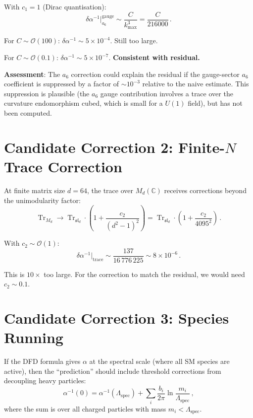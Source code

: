 \documentclass[11pt,a4paper]{article}
\newcommand{\Tr}{\operatorname{Tr}}
\begin{document}
With $c_1 = 1$ (Dirac quantisation):
\begin{equation}
\delta\alpha^{-1}\big|_{a_6}^{\mathrm{gauge}} \sim \frac{C}{k_{\max}^3} = \frac{C}{216000}\,.
\end{equation}

For $C \sim \mathcal{O}(100)$: $\delta\alpha^{-1} \sim 5 \times 10^{-4}$. Still too large.

For $C \sim \mathcal{O}(0.1)$: $\delta\alpha^{-1} \sim 5 \times 10^{-7}$. \textbf{Consistent with residual.}

\textbf{Assessment}: The $a_6$ correction could explain the residual if the gauge-sector $a_6$ coefficient is suppressed by a factor of $\sim 10^{-3}$ relative to the naive estimate. This suppression is plausible (the $a_6$ gauge contribution involves a trace over the curvature endomorphism cubed, which is small for a $U(1)$ field), but has not been computed.

\section{Candidate Correction 2: Finite-$N$ Trace Correction}

At finite matrix size $d = 64$, the trace over $M_d(\mathbb{C})$ receives corrections beyond the unimodularity factor:
\begin{equation}
\Tr_{M_d} \to \Tr_{\mathfrak{sl}_d} \cdot \left(1 + \frac{c_2}{(d^2-1)^2}\right) = \Tr_{\mathfrak{sl}_d} \cdot \left(1 + \frac{c_2}{4095^2}\right)\,.
\end{equation}

With $c_2 \sim \mathcal{O}(1)$:
\begin{equation}
\delta\alpha^{-1}\big|_{\mathrm{trace}} \sim \frac{137}{16\,776\,225} \sim 8 \times 10^{-6}\,.
\end{equation}

This is $10\times$ too large. For the correction to match the residual, we would need $c_2 \sim 0.1$.

\section{Candidate Correction 3: Species Running}

If the DFD formula gives $\alpha$ at the spectral scale (where all SM species are active), then the ``prediction'' should include threshold corrections from decoupling heavy particles:
\begin{equation}
\alpha^{-1}(0) = \alpha^{-1}(\Lambda_{\mathrm{spec}}) + \sum_i \frac{b_i}{2\pi}\ln\frac{m_i}{\Lambda_{\mathrm{spec}}}\,,
\end{equation}
where the sum is over all charged particles with mass $m_i < \Lambda_{\mathrm{spec}}$.
\end{document}

